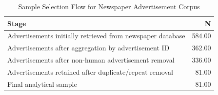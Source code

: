 \begin{table}[ht]
\centering
\begin{tabular}{lr}
  \hline
Stage & N \\ 
  \hline
Advertisements initially retrieved from newspaper database & 584.00 \\ 
  Advertisements after aggregation by advertisement ID & 362.00 \\ 
  Advertisements after non-human advertisement removal & 336.00 \\ 
  Advertisements retained after duplicate/repeat removal & 81.00 \\ 
  Final analytical sample & 81.00 \\ 
   \hline
\end{tabular}
\caption{Sample Selection Flow for Newspaper Advertisement Corpus} 
\end{table}
